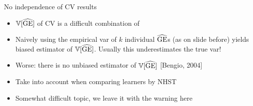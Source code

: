 \documentclass[11pt,compress,t,notes=noshow, xcolor=table]{beamer}
\begin{document}

\begin{vbframe}{No independence of CV results}

\begin{itemize}
\item $\mathbb{V}[\widehat{\mathrm{GE}}]$ of CV is a difficult combination of 
\begin{itemize}
\end{itemize}
\item Naively using the empirical var of $k$ individual $\widehat{\mathrm{GE}}$s (as on slide before) yields biased 
estimator of $\mathbb{V}[\widehat{\mathrm{GE}}]$. Usually this underestimates the true var!
\item Worse: there is no unbiased estimator of $\mathbb{V}[\widehat{\mathrm{GE}}]$ [Bengio, 2004]
\item Take into account when comparing learners by NHST
\item Somewhat difficult topic, we leave it with the warning here
\end{itemize}

\end{vbframe}





\end{document}
